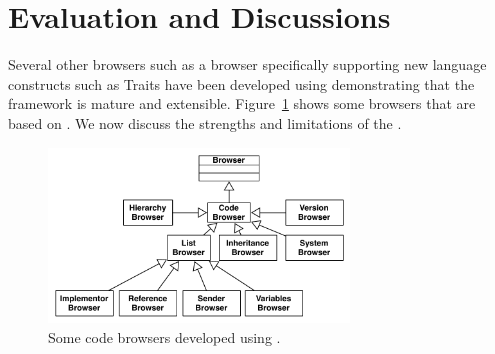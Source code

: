 \documentclass[a4paper,10pt,twoside]{book}
\begin{document}


\section{Evaluation and Discussions} 

Several other browsers such as a browser specifically supporting new language constructs such as Traits have been developed using \obf demonstrating that the framework is mature and extensible. Figure~\ref{browsers} shows some browsers that are based on \obf.
 We now discuss the strengths and limitations of the \obf.



\begin{figure}
\begin{center}
\includegraphics[width=8cm]{BrowserFamily}
\caption{Some code browsers developed using \obf.}\label{browsers}
\end{center}
\end{figure}
\end{document}
